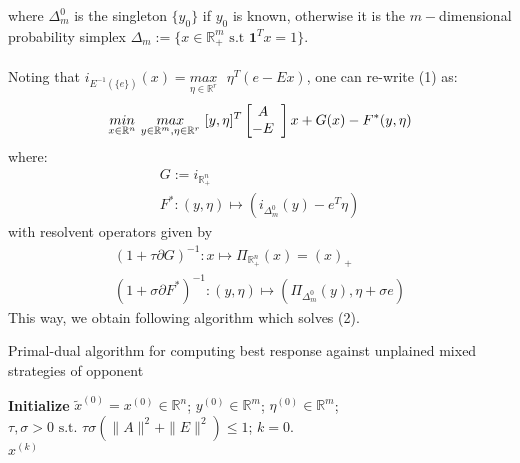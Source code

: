 \documentclass[a4paper,10pt,journal]{IEEEtran}
\begin{document}
where $\Delta_{m}^0$ is the singleton $\{y_0\}$ if $y_0$ is known, otherwise it is the $m-$dimensional probability simplex $\Delta_{m} := \{x \in \mathbb{R}_{+}^m \text{ s.t }\textbf{1}^Tx = 1\}$.\\\\
Noting that $i_{E^{-1}(\{e\})}(x) = \underset{\eta \in \mathbb{R}^r}{max}\text{ }\eta^T(e - Ex)$, one can re-write (1) as:
\begin{equation}
  \underset{x \in \mathbb{R}^n}{min}\text{ }\underset{y \in \mathbb{R}^m, \eta \in \mathbb{R}^r}{max}\text{ }[y,\eta]^T\left[ \begin{array}{@{}cc@{}}
    A \\
    -E
    \end{array} \right]x + G(x) - F^*(y, \eta)
\end{equation}
where:
\begin{equation}
  \begin{aligned}
    G:=i_{\mathbb{R}_{+}^n}\\
    F^*: (y, \eta) \mapsto (i_{\Delta_{m}^0}(y) - e^T\eta)
  \end{aligned}
\end{equation}
with resolvent operators given by
\begin{equation}
  \begin{aligned}
    (1 + \tau \partial G)^{-1}: x \mapsto \Pi_{\mathbb{R}_{+}^n}(x) = (x)_+\\
    (1 + \sigma \partial F^*)^{-1}: (y, \eta) \mapsto (\Pi_{\Delta_{m}^0}(y), \eta + \sigma e)%
  \end{aligned}
\end{equation}
This way, we obtain following algorithm which solves (2).

\begin{algorithm}[htb]
\caption{Primal-dual algorithm for computing best response against unplained mixed strategies of opponent}%
\textbf{Initialize} $\tilde{x}^{(0)} = x^{(0)} \in \mathbb{R}^n$; $y^{(0)} \in \mathbb{R}^{m}$; $\eta^{(0)} \in \mathbb{R}^{m}$;
$\tau, \sigma > 0 \text{ s.t. }\tau\sigma (\|A\|^2 + \|E\|^2) \le 1$; $k = 0$.\\
 \Return $x^{(k)}$
\label{Tab:pseudocode_lbfgs}
\end{algorithm}
\end{document}
